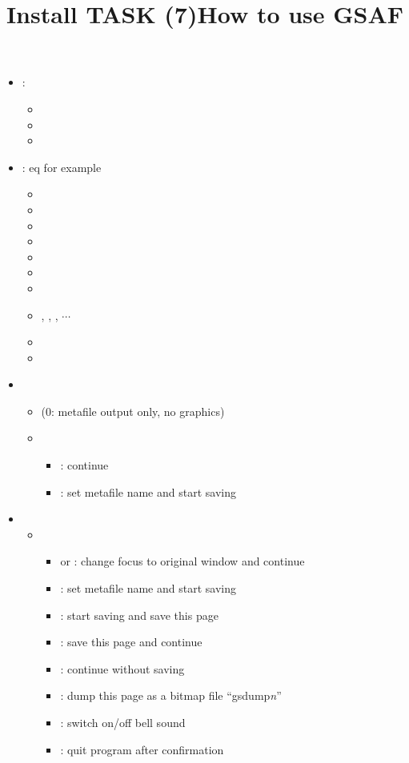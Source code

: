 \documentclass[12pt]{article}
\begin{document}
\title{Install TASK (7)}
\begin{itemize}
\item
  :
  \begin{itemize}
  \item
  \item
  \item
\end{itemize}
\item
  : eq for example
  \begin{itemize}
  \item
  \item
  \item
  \item
  \item
  \item
  \item
  \item
    , , , $\cdots$
  \item
  \item
  \end{itemize}
\end{itemize}

\title{How to use GSAF}
\begin{itemize}
\item
{}
\begin{itemize}
\item
{} (0: metafile output only, no graphics)
\item
{}
\begin{itemize}
\item
{}: continue
\item
{}: set metafile name and start saving
\end{itemize}
\end{itemize}
\item
{}
\begin{itemize}
\item
{}
\begin{itemize}
\item
{} or : change focus to original window and continue
\item
{}: set metafile name and start saving
\item
{}: start saving and save this page
\item
{}: save this page and continue
\item
{}: continue without saving
\item
{}: dump this page as a bitmap file ``gsdump\textit{n}''
\item
{}: switch on/off bell sound
\item
{}: quit program after confirmation
\end{itemize}
\end{itemize}
\end{itemize}
\end{document}
